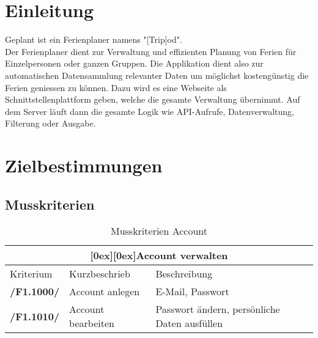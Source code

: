 \documentclass[10pt,a4paper,titlepage,twoside,german]{zhawreprt}
\newcommand{\AddRequirement}[2]{
\textbf{/#1#2/}
}
\newcommand{\F}[1]{
\AddRequirement{F1.}{#1}
}
\newcommand{\tableheader}[2]{\multicolumn{#1}{c}{\raisebox{-0.3em}[0ex][0ex]{\large{\textbf{#2}}}}}
\begin{document}
\maketitle

\tableofcontents

\chapter{Einleitung}\label{chp:Introduction}
Geplant ist ein Ferienplaner namens "[Trip]od".\\
Der Ferienplaner dient zur Verwaltung und effizienten Planung von Ferien für Einzelpersonen oder ganzen Gruppen. Die Applikation dient also zur automatischen Datensammlung relevanter Daten um möglichst kostengünstig die Ferien geniessen zu können. Dazu wird es eine Webseite als Schnittstellenplattform geben, welche die gesamte Verwaltung übernimmt. Auf dem Server läuft dann die gesamte Logik wie API-Aufrufe, Datenverwaltung, Filterung oder Ausgabe.
\chapter{Zielbestimmungen}\label{chp:DefinitionOfGoals}
\section{Musskriterien}\label{sec:MustCriteria}
\begin{table}[ht]\centering
\begin{tabular}{l|p{4.5cm}|p{7.5cm}}\hline
\tableheader{3}{Account verwalten}\\[0.3em]\hline
Kriterium & Kurzbeschrieb & Beschreibung\\\hline
\F{1000} & Account anlegen & E-Mail, Passwort\\\hline
\F{1010} & Account bearbeiten & Passwort ändern, persönliche Daten ausfüllen
\end{tabular}
\caption{Musskriterien Account}\label{tbl:MustAccount}
\end{table}
\end{document}
